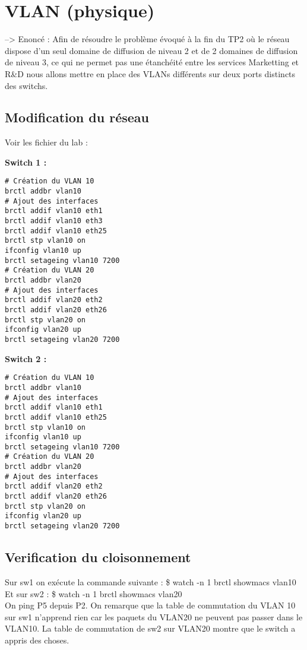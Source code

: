 \documentclass[a4paper]{article}
\begin{document}
	\section{VLAN (physique)}
		
\noindent
--> Enoncé : Afin de résoudre le problème évoqué à la fin du TP2 où le réseau dispose d'un seul domaine de diffusion de niveau 2 et de 2 domaines de diffusion de niveau 3, ce qui ne permet pas une étanchéité entre les services Marketting et R\&D nous allons mettre en place des VLANs différents sur deux ports distincts des switchs. 
		\subsection{Modification du réseau}
Voir les fichier du lab :

\textbf{Switch 1 :}

\begin{verbatim}
# Création du VLAN 10
brctl addbr vlan10
# Ajout des interfaces
brctl addif vlan10 eth1
brctl addif vlan10 eth3
brctl addif vlan10 eth25
brctl stp vlan10 on
ifconfig vlan10 up
brctl setageing vlan10 7200
# Création du VLAN 20
brctl addbr vlan20
# Ajout des interfaces
brctl addif vlan20 eth2
brctl addif vlan20 eth26
brctl stp vlan20 on
ifconfig vlan20 up
brctl setageing vlan20 7200
\end{verbatim}

\textbf{Switch 2 :}

\begin{verbatim}
# Création du VLAN 10
brctl addbr vlan10
# Ajout des interfaces
brctl addif vlan10 eth1
brctl addif vlan10 eth25
brctl stp vlan10 on
ifconfig vlan10 up
brctl setageing vlan10 7200
# Création du VLAN 20
brctl addbr vlan20
# Ajout des interfaces
brctl addif vlan20 eth2
brctl addif vlan20 eth26
brctl stp vlan20 on
ifconfig vlan20 up
brctl setageing vlan20 7200
\end{verbatim}


		\subsection{Verification du cloisonnement}
Sur sw1 on exécute la commande suivante : \$ watch -n 1 brctl showmacs vlan10 \\

Et sur sw2 : \$ watch -n 1 brctl showmacs vlan20 \\

On ping P5 depuis P2. On remarque que la table de commutation du VLAN 10 sur sw1 n'apprend rien car les paquets du VLAN20 ne peuvent pas passer dans le VLAN10. La table de commutation de sw2 sur VLAN20 montre que le switch a appris des choses. \\
\end{document}
